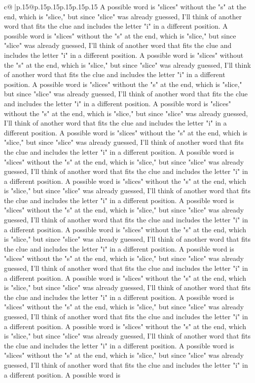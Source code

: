 \documentclass{article}
\begin{document}
{\begin{supertabular}{c@{$\;$}|p{.15\linewidth}@{}p{.15\linewidth}p{.15\linewidth}p{.15\linewidth}p{.15\linewidth}p{.15\linewidth}}
{{{A possible word is "slices" without the "s" at the end, which is "slice," but since "slice" was already guessed, I'll think of another word that fits the clue and includes the letter "i" in a different position. A possible word is "slices" without the "s" at the end, which is "slice," but since "slice" was already guessed, I'll think of another word that fits the clue and includes the letter "i" in a different position. A possible word is "slices" without the "s" at the end, which is "slice," but since "slice" was already guessed, I'll think of another word that fits the clue and includes the letter "i" in a different position. A possible word is "slices" without the "s" at the end, which is "slice," but since "slice" was already guessed, I'll think of another word that fits the clue and includes the letter "i" in a different position. A possible word is "slices" without the "s" at the end, which is "slice," but since "slice" was already guessed, I'll think of another word that fits the clue and includes the letter "i" in a different position. A possible word is "slices" without the "s" at the end, which is "slice," but since "slice" was already guessed, I'll think of another word that fits the clue and includes the letter "i" in a different position. A possible word is "slices" without the "s" at the end, which is "slice," but since "slice" was already guessed, I'll think of another word that fits the clue and includes the letter "i" in a different position. A possible word is "slices" without the "s" at the end, which is "slice," but since "slice" was already guessed, I'll think of another word that fits the clue and includes the letter "i" in a different position. A possible word is "slices" without the "s" at the end, which is "slice," but since "slice" was already guessed, I'll think of another word that fits the clue and includes the letter "i" in a different position. A possible word is "slices" without the "s" at the end, which is "slice," but since "slice" was already guessed, I'll think of another word that fits the clue and includes the letter "i" in a different position. A possible word is "slices" without the "s" at the end, which is "slice," but since "slice" was already guessed, I'll think of another word that fits the clue and includes the letter "i" in a different position. A possible word is "slices" without the "s" at the end, which is "slice," but since "slice" was already guessed, I'll think of another word that fits the clue and includes the letter "i" in a different position. A possible word is "slices" without the "s" at the end, which is "slice," but since "slice" was already guessed, I'll think of another word that fits the clue and includes the letter "i" in a different position. A possible word is "slices" without the "s" at the end, which is "slice," but since "slice" was already guessed, I'll think of another word that fits the clue and includes the letter "i" in a different position. A possible word is "slices" without the "s" at the end, which is "slice," but since "slice" was already guessed, I'll think of another word that fits the clue and includes the letter "i" in a different position. A possible word is }}}
\end{supertabular}}
\end{document}

